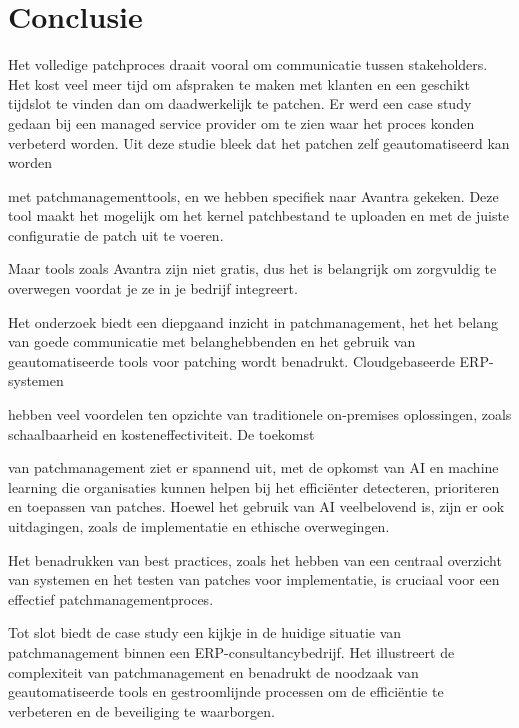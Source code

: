 
\chapter{Conclusie}%
\label{ch:conclusie}


Het volledige patchproces draait vooral om communicatie tussen stakeholders. Het kost veel meer tijd om afspraken te maken met klanten en een geschikt tijdslot te vinden dan om daadwerkelijk te patchen. Er werd een case study gedaan bij een managed service provider om te zien waar het proces konden verbeterd worden. Uit deze studie bleek dat het patchen zelf geautomatiseerd kan worden

met patchmanagementtools, en we hebben specifiek naar Avantra gekeken. Deze tool maakt het mogelijk om het kernel patchbestand te uploaden en met de juiste configuratie de patch uit te voeren.

Maar tools zoals Avantra zijn niet gratis, dus het is belangrijk om zorgvuldig te overwegen voordat je ze in je bedrijf integreert.

Het onderzoek biedt een diepgaand inzicht in patchmanagement, het het belang van goede communicatie met belanghebbenden en het gebruik van geautomatiseerde tools voor patching wordt benadrukt. Cloudgebaseerde ERP-systemen 

hebben veel voordelen ten opzichte van traditionele on-premises oplossingen, zoals schaalbaarheid en kosteneffectiviteit. De toekomst

van patchmanagement ziet er spannend uit, met de opkomst van AI en machine learning die organisaties kunnen helpen bij het efficiënter detecteren, prioriteren en toepassen van patches. Hoewel het gebruik van AI veelbelovend is, zijn er ook uitdagingen, zoals de implementatie en ethische overwegingen.

Het benadrukken van best practices, zoals het hebben van een centraal overzicht van systemen en het testen van patches voor implementatie, is cruciaal voor een effectief patchmanagementproces.

Tot slot biedt de case study een kijkje in de huidige situatie van patchmanagement binnen een ERP-consultancybedrijf. Het illustreert de complexiteit van patchmanagement en benadrukt de noodzaak van geautomatiseerde tools en gestroomlijnde processen om de efficiëntie te verbeteren en de beveiliging te waarborgen.